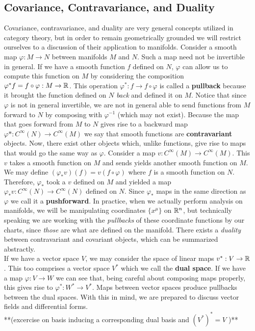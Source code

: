\subsection*{Covariance, Contravariance, and Duality}
Covariance, contravariance, and duality are very general concepts utilized in category theory, but in order to remain geometrically grounded we will restrict ourselves to a discussion of their application to manifolds.  Consider a smooth map $\varphi: M \to N$ between manifolds $M$ and $N$.  Such a map need not be invertible in general.  If we have a smooth function $f$ defined on $N$, $\varphi$ can allow us to compute this function on $M$ by considering the composition $\varphi^*f = f\circ \varphi : M \to \mathbb{R}$.  This operation $\varphi^*: f \to f\circ \varphi$ is called a \textbf{pullback} because it brought the function defined on $N$ \textit{back} and defined it on $M$.  Notice that since $\varphi$ is not in general invertible, we are not in general able to send functions from $M$ forward to $N$ by composing with $\varphi^{-1}$ (which may not exist).  Because the map that goes forward from $M$ to $N$ gives rise to a backward map  $\varphi*: C^\infty(N) \to C^\infty(M)$ we say that smooth functions are \textbf{contravariant} objects.  Now, there exist other objects which, unlike functions, give rise to maps that would go the same way as $\varphi$.  Consider a map $v:C^\infty(M)\to C^\infty(M)$.  This $v$ takes a smooth function on $M$ and sends yields another smooth function on $M$.  We may define $(\varphi_*v)(f) = v(f\circ\varphi)$ where $f$ is a smooth function on $N$.  Therefore, $\varphi_*$ took a $v$ defined on $M$ and yielded a map $\varphi_* v: C^\infty(N) \to C^\infty(N)$ defined on $N$.  Since $\varphi_*$ maps in the same direction as $\varphi$ we call it a \textbf{pushforward}.  In practice, when we actually perform analysis on manifolds, we will be manipulating coordinates $\{x^\mu\}$ on $\mathbb{R}^n$, but technically speaking we are working with the \textit{pullbacks} of these coordinate functions by our charts, since \textit{those} are what are defined on the manifold.  There exists a \textit{duality} between contravariant and covariant objects, which can be summarized abstractly.  \\

If we have a vector space $V$, we may consider the space of linear maps $v^*: V \to \mathbb{R}$.  This too comprises a vector space $V^*$ which we call the \textbf{dual space}.  If we have a map $\varphi:V \to W$ we can see that, being careful about composing maps properly, this gives rise to $\varphi^*: W^* \to V^*$.  Maps between vector spaces produce pullbacks between the dual spaces.  With this in mind, we are prepared to discuss vector fields and differential forms.\\
**(excercise on basis inducing a corresponding dual basis and $(V^*)^* = V$ )**

